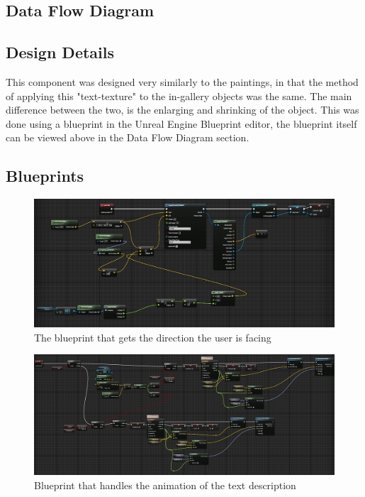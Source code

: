 \subsection{Data Flow Diagram}

\subsection{Design Details}
This component was designed very similarly to the paintings, in that the method of applying this "text-texture" to the in-gallery objects was the same.  The main difference between the two, is the enlarging and shrinking of the object.  This was done using a blueprint in the Unreal Engine Blueprint editor, the blueprint itself can be viewed above in the Data Flow Diagram section.  

\subsection{Blueprints}
\begin{figure}
\centering
\includegraphics[scale=0.5]{Blueprints/TextDescription1.png}
\caption{The blueprint that gets the direction the user is facing}
\end{figure}
\begin{figure}
\centering
\includegraphics[scale=0.5]{Blueprints/TextDescription2.png}
\caption{Blueprint that handles the animation of the text description}
\end{figure}

